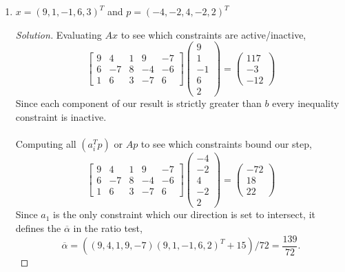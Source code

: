 \documentclass[12pt]{article}
\makeatletter
\theoremstyle{homework}
\newenvironment{exercise}[1]
{\def\@currentlabel{#1}\exercisecore}
{\endexercisecore}
\makeatother
\begin{document}
\begin{exercise}{1.3}
\begin{enumerate}
  \item[\textbf{(iv)}] $x = (9, 1, -1, 6, 3)^T$ and $p = (-4, -2, 4, -2, 2)^T$
  \begin{proof}[Solution] Evaluating $Ax$ to see which constraints are active/inactive, 
    \begin{equation*}
      \begin{bmatrix}9&4&1&9&-7\\ 6&-7&8&-4&-6\\ 1&6&3&-7&6\end{bmatrix}\begin{pmatrix}9\\ 1\\ -1\\ 6\\ 2\end{pmatrix}=\begin{pmatrix}117\\ -3\\ -12\end{pmatrix}
  \end{equation*}
    Since each component of our result is strictly greater than $b$ every inequality constraint is inactive.\\\\
    Computing all $(a_i^Tp)$ or $Ap$ to see which constraints bound our step, 
    \begin{equation*}
      \begin{bmatrix}9&4&1&9&-7\\ 6&-7&8&-4&-6\\ 1&6&3&-7&6\end{bmatrix}\begin{pmatrix}-4\\ -2\\ 4\\ -2\\ 2\end{pmatrix}=\begin{pmatrix}-72\\ 18\\ 22\end{pmatrix}
    \end{equation*}
    Since $a_1$ is the only constraint which our direction is set to intersect, it defines the $\overline{\alpha}$ in the ratio test, 
    \begin{equation*}
      \overline{\alpha} = (( 9, 4 ,1 , 9 ,-7)(9, 1, -1, 6, 2)^T + 15)/72 = \frac{139}{72}.
    \end{equation*}
  \end{proof}
  \end{enumerate}

\end{exercise}
\vspace{.5in}
\end{document}
